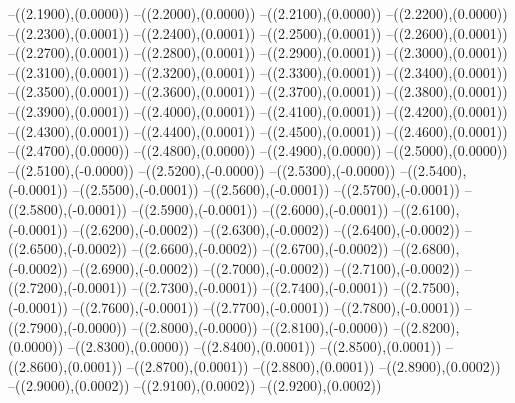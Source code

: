 {	--({\sx*(2.1900)},{\sy*(0.0000)})
	--({\sx*(2.2000)},{\sy*(0.0000)})
	--({\sx*(2.2100)},{\sy*(0.0000)})
	--({\sx*(2.2200)},{\sy*(0.0000)})
	--({\sx*(2.2300)},{\sy*(0.0001)})
	--({\sx*(2.2400)},{\sy*(0.0001)})
	--({\sx*(2.2500)},{\sy*(0.0001)})
	--({\sx*(2.2600)},{\sy*(0.0001)})
	--({\sx*(2.2700)},{\sy*(0.0001)})
	--({\sx*(2.2800)},{\sy*(0.0001)})
	--({\sx*(2.2900)},{\sy*(0.0001)})
	--({\sx*(2.3000)},{\sy*(0.0001)})
	--({\sx*(2.3100)},{\sy*(0.0001)})
	--({\sx*(2.3200)},{\sy*(0.0001)})
	--({\sx*(2.3300)},{\sy*(0.0001)})
	--({\sx*(2.3400)},{\sy*(0.0001)})
	--({\sx*(2.3500)},{\sy*(0.0001)})
	--({\sx*(2.3600)},{\sy*(0.0001)})
	--({\sx*(2.3700)},{\sy*(0.0001)})
	--({\sx*(2.3800)},{\sy*(0.0001)})
	--({\sx*(2.3900)},{\sy*(0.0001)})
	--({\sx*(2.4000)},{\sy*(0.0001)})
	--({\sx*(2.4100)},{\sy*(0.0001)})
	--({\sx*(2.4200)},{\sy*(0.0001)})
	--({\sx*(2.4300)},{\sy*(0.0001)})
	--({\sx*(2.4400)},{\sy*(0.0001)})
	--({\sx*(2.4500)},{\sy*(0.0001)})
	--({\sx*(2.4600)},{\sy*(0.0001)})
	--({\sx*(2.4700)},{\sy*(0.0000)})
	--({\sx*(2.4800)},{\sy*(0.0000)})
	--({\sx*(2.4900)},{\sy*(0.0000)})
	--({\sx*(2.5000)},{\sy*(0.0000)})
	--({\sx*(2.5100)},{\sy*(-0.0000)})
	--({\sx*(2.5200)},{\sy*(-0.0000)})
	--({\sx*(2.5300)},{\sy*(-0.0000)})
	--({\sx*(2.5400)},{\sy*(-0.0001)})
	--({\sx*(2.5500)},{\sy*(-0.0001)})
	--({\sx*(2.5600)},{\sy*(-0.0001)})
	--({\sx*(2.5700)},{\sy*(-0.0001)})
	--({\sx*(2.5800)},{\sy*(-0.0001)})
	--({\sx*(2.5900)},{\sy*(-0.0001)})
	--({\sx*(2.6000)},{\sy*(-0.0001)})
	--({\sx*(2.6100)},{\sy*(-0.0001)})
	--({\sx*(2.6200)},{\sy*(-0.0002)})
	--({\sx*(2.6300)},{\sy*(-0.0002)})
	--({\sx*(2.6400)},{\sy*(-0.0002)})
	--({\sx*(2.6500)},{\sy*(-0.0002)})
	--({\sx*(2.6600)},{\sy*(-0.0002)})
	--({\sx*(2.6700)},{\sy*(-0.0002)})
	--({\sx*(2.6800)},{\sy*(-0.0002)})
	--({\sx*(2.6900)},{\sy*(-0.0002)})
	--({\sx*(2.7000)},{\sy*(-0.0002)})
	--({\sx*(2.7100)},{\sy*(-0.0002)})
	--({\sx*(2.7200)},{\sy*(-0.0001)})
	--({\sx*(2.7300)},{\sy*(-0.0001)})
	--({\sx*(2.7400)},{\sy*(-0.0001)})
	--({\sx*(2.7500)},{\sy*(-0.0001)})
	--({\sx*(2.7600)},{\sy*(-0.0001)})
	--({\sx*(2.7700)},{\sy*(-0.0001)})
	--({\sx*(2.7800)},{\sy*(-0.0001)})
	--({\sx*(2.7900)},{\sy*(-0.0000)})
	--({\sx*(2.8000)},{\sy*(-0.0000)})
	--({\sx*(2.8100)},{\sy*(-0.0000)})
	--({\sx*(2.8200)},{\sy*(0.0000)})
	--({\sx*(2.8300)},{\sy*(0.0000)})
	--({\sx*(2.8400)},{\sy*(0.0001)})
	--({\sx*(2.8500)},{\sy*(0.0001)})
	--({\sx*(2.8600)},{\sy*(0.0001)})
	--({\sx*(2.8700)},{\sy*(0.0001)})
	--({\sx*(2.8800)},{\sy*(0.0001)})
	--({\sx*(2.8900)},{\sy*(0.0002)})
	--({\sx*(2.9000)},{\sy*(0.0002)})
	--({\sx*(2.9100)},{\sy*(0.0002)})
	--({\sx*(2.9200)},{\sy*(0.0002)})
}
